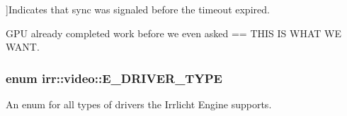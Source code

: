 \begin{Desc}
\begin{description}
{}]Indicates that sync​ was signaled before the timeout expired. \item[{\em 
E\+D\+F\+R\+\_\+\+A\+L\+R\+E\+A\+D\+Y\+\_\+\+S\+I\+G\+N\+A\+L\+ED\hypertarget{namespaceirr_1_1video_ae93020af22218bae203c7bb52b87590ba9c2bd52f326df5e621b74f8bb2b2dd7f}{}\label{namespaceirr_1_1video_ae93020af22218bae203c7bb52b87590ba9c2bd52f326df5e621b74f8bb2b2dd7f}
}]G\+PU already completed work before we even asked == T\+H\+IS IS W\+H\+AT WE W\+A\+NT. \end{description}
\end{Desc}
\subsubsection[{\texorpdfstring{E\+\_\+\+D\+R\+I\+V\+E\+R\+\_\+\+T\+Y\+PE}{E\_DRIVER\_TYPE}}]{\setlength{\rightskip}{0pt plus 5cm}enum {\bf irr\+::video\+::\+E\+\_\+\+D\+R\+I\+V\+E\+R\+\_\+\+T\+Y\+PE}}\hypertarget{namespaceirr_1_1video_ae35a6de6d436c76107ad157fe42356d0}{}\label{namespaceirr_1_1video_ae35a6de6d436c76107ad157fe42356d0}


An enum for all types of drivers the Irrlicht Engine supports. 

